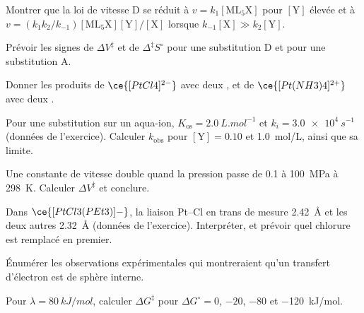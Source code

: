 \begin{exercise}[$\star$]\label{exo:b3:complex-mechanisms:2}
Montrer que la loi de vitesse D se réduit à $v = k_1[\mathrm{ML_5X}]$ pour $[\mathrm Y]$ élevée et à $v = (k_1k_2/k_{-1})
[\mathrm{ML_5X}][\mathrm Y]/[\mathrm X]$ lorsque $k_{-1}[\mathrm X] \gg k_2[\mathrm Y]$.
\end{exercise}

\begin{exercise}[$\star$]\label{exo:b3:complex-mechanisms:3}
Prévoir les signes de $\Delta V^{\ddagger}$ et de $\Delta^{\ddagger}S^\circ$ pour une substitution D et pour une substitution A.
\end{exercise}

\begin{exercise}[$\star$]\label{exo:b3:complex-mechanisms:4}
Donner les produits de $\ce{[PtCl4]^{2-}}$ avec deux , et de $\ce{[Pt(NH3)4]^{2+}}$ avec deux .
\end{exercise}

\begin{exercise}[$\star\star$]\label{exo:b3:complex-mechanisms:5}
Pour une substitution sur un aqua-ion, $K_{\mathrm{os}} = \qty{2.0}{L.mol^{-1}}$ et $k_i = \qty{3.0e4}{s^{-1}}$ (données
de l'exercice). Calculer $k_{\mathrm{obs}}$ pour $[\mathrm Y] = 0.10$ et \qty{1.0}{mol/L}, ainsi que sa limite.
\end{exercise}

\begin{exercise}[$\star\star$]\label{exo:b3:complex-mechanisms:6}
Une constante de vitesse double quand la pression passe de 0.1 à
\qty{100}{MPa} à \qty{298}{K}. Calculer $\Delta V^{\ddagger}$ et conclure.
\end{exercise}

\begin{exercise}[$\star\star$]\label{exo:b3:complex-mechanisms:7}
Dans $\ce{[PtCl3(PEt3)]-}$, la liaison Pt--Cl en trans de  mesure \qty{2.42}{\angstrom} et les deux autres \qty{2.32}{\angstrom}
(données de l'exercice). Interpréter, et prévoir quel chlorure est remplacé
en premier.
\end{exercise}

\begin{exercise}[$\star\star$]\label{exo:b3:complex-mechanisms:8}
Énumérer les observations expérimentales qui montreraient qu'un transfert
d'électron est de sphère interne.
\end{exercise}

\begin{exercise}[$\star\star$]\label{exo:b3:complex-mechanisms:9}
Pour $\lambda = \qty{80}{kJ/mol}$, calculer $\Delta G^{\ddagger}$ pour $\Delta G^\circ = 0$, $-20$, $-80$ et \qty{-120}{kJ/mol}.
\end{exercise}

